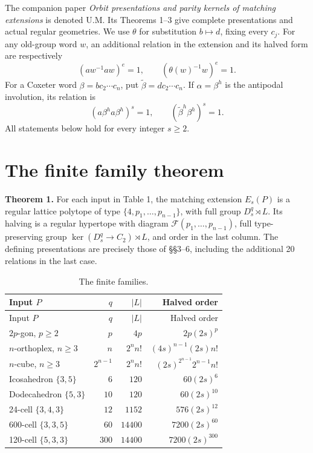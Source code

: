 The companion paper \emph{Orbit presentations and parity kernels of matching extensions} is denoted U.M. Its Theorems 1--3 give complete presentations and actual regular geometries. We use \(\theta\) for substitution \(b\mapsto d\), fixing every \(c_j\). For any old-group word \(w\), an additional relation in the extension and its halved form are respectively
\[
 (a w^{-1}a w)^e=1,
 \qquad (\theta(w)^{-1}w)^e=1.                 \tag{1}
\]
For a Coxeter word \(\beta=b c_2\cdots c_n\), put \(\widetilde\beta=d c_2\cdots c_n\). If \(\alpha=\beta^h\) is the antipodal involution, its relation is
\[
 (a\beta^h a\beta^h)^s=1,
 \qquad (\widetilde\beta^h\beta^h)^s=1.       \tag{2}
\]
All statements below hold for every integer \(s\ge2\).

\section{The finite family theorem}\label{the-finite-family-theorem}

\textbf{Theorem 1.} For each input in Table 1, the matching extension \(E_s(P)\) is a regular lattice polytope of type \(\{4,p_1,\ldots,p_{n-1}\}\), with full group \(D_s^q\rtimes L\). Its halving is a regular hypertope with diagram \(\mathcal F(p_1,\ldots,p_{n-1})\), full type-preserving group \(\ker(D_s^q\to C_2)\rtimes L\), and order in the last column. The defining presentations are precisely those of §§3--6, including the additional 20 relations in the last case.

\begin{longtable}{@{}lrrr@{}}
\caption{The finite families.}\tabularnewline
\toprule\noalign{}
Input \(P\) & \(q\) & \(|L|\) & Halved order \\
\midrule\noalign{}
\endfirsthead
\toprule\noalign{}
Input \(P\) & \(q\) & \(|L|\) & Halved order \\
\midrule\noalign{}
\endhead
\bottomrule\noalign{}
\endlastfoot
\(2p\)-gon, \(p\ge2\) & \(p\) & \(4p\) & \(2p(2s)^p\) \\
\(n\)-orthoplex, \(n\ge3\) & \(n\) & \(2^n n!\) & \((4s)^{n-1}(2s)n!\) \\
\(n\)-cube, \(n\ge3\) & \(2^{n-1}\) & \(2^n n!\) & \((2s)^{2^{n-1}}2^{n-1}n!\) \\
Icosahedron \(\{3,5\}\) & \(6\) & \(120\) & \(60(2s)^6\) \\
Dodecahedron \(\{5,3\}\) & \(10\) & \(120\) & \(60(2s)^{10}\) \\
24-cell \(\{3,4,3\}\) & \(12\) & \(1152\) & \(576(2s)^{12}\) \\
600-cell \(\{3,3,5\}\) & \(60\) & \(14400\) & \(7200(2s)^{60}\) \\
120-cell \(\{5,3,3\}\) & \(300\) & \(14400\) & \(7200(2s)^{300}\) \\
\end{longtable}

